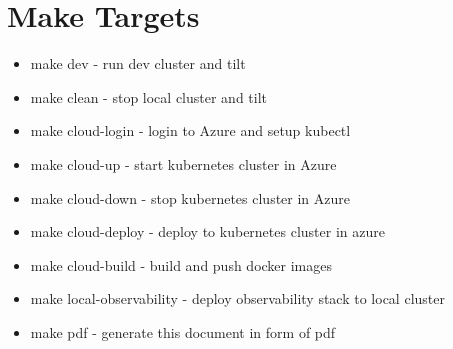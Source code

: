 \chapter{Make Targets}
\label{sec:app_05}

\begin{itemize}
    \item make dev - run dev cluster and tilt
	\item make clean - stop local cluster and tilt
	\item make cloud-login - login to Azure and setup kubectl
	\item make cloud-up - start kubernetes cluster in Azure
	\item make cloud-down - stop kubernetes cluster in Azure
	\item make cloud-deploy - deploy to kubernetes cluster in azure
	\item make cloud-build - build and push docker images
	\item make local-observability - deploy observability stack to local cluster
	\item make pdf - generate this document in form of pdf
\end{itemize}
